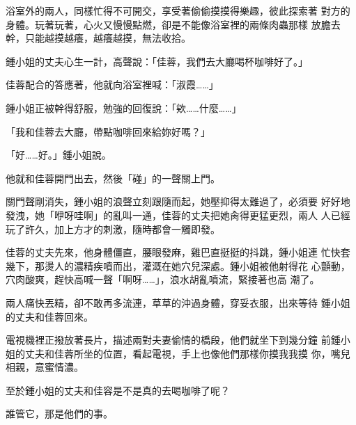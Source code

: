 浴室外的兩人，同樣忙得不可開交，享受著偷偷摸摸得樂趣，彼此探索著
對方的身體。玩著玩著，心火又慢慢點燃，卻是不能像浴室裡的兩條肉蟲那樣
放膽去幹，只能越摸越癢，越癢越摸，無法收拾。

鍾小姐的丈夫心生一計，高聲說：「佳蓉，我們去大廳喝杯咖啡好了。」

佳蓉配合的答應著，他就向浴室裡喊：「淑霞……」

鍾小姐正被幹得舒服，勉強的回復說：「欸……什麼……」

「我和佳蓉去大廳，帶點咖啡回來給妳好嗎？」

「好……好。」鍾小姐說。

他就和佳蓉開門出去，然後「碰」的一聲關上門。

關門聲剛消失，鍾小姐的浪聲立刻跟隨而起，她壓抑得太難過了，必須要
好好地發洩，她「咿呀哇啊」的亂叫一通，佳蓉的丈夫把她肏得更猛更烈，兩人
人已經玩了許久，加上方才的刺激，隨時都會一觸即發。

佳蓉的丈夫先來，他身體僵直，腰眼發麻，雞巴直挺挺的抖跳，鍾小姐連
忙快套幾下，那燙人的濃精疾噴而出，灌溉在她穴兒深處。鍾小姐被他射得花
心顫動，穴肉酸爽，趕快高喊一聲「啊呀……」，浪水胡亂噴流，緊接著也高
潮了。

兩人痛快丟精，卻不敢再多流連，草草的沖過身體，穿妥衣服，出來等待
鍾小姐的丈夫和佳蓉回來。

電視機裡正撥放著長片，描述兩對夫妻偷情的橋段，他們就坐下到幾分鐘
前鍾小姐的丈夫和佳蓉所坐的位置，看起電視，手上也像他們那樣你摸我我摸
你，嘴兒相親，意蜜情濃。

至於鍾小姐的丈夫和佳容是不是真的去喝咖啡了呢？

誰管它，那是他們的事。










